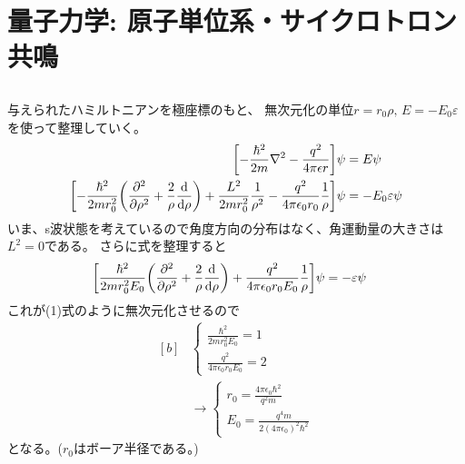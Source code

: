 \documentclass[../../sp_2013.tex]{subfiles}
\begin{document}
\section{量子力学: 原子単位系・サイクロトロン共鳴}
\subsection{}
与えられたハミルトニアンを極座標のもと、
無次元化の単位\(r=r_0 \rho,\,E=-E_0 \varepsilon\)を使って整理していく。
\begin{equation}\begin{aligned}[b]
    \qty[-\frac{\hbar^2}{2m}\laplacian - \frac{q^2}{4\pi\epsilon r}]\psi &= E\psi\\
    \qty[-\frac{\hbar^2}{2mr_0^2}\qty(\pdv[2]{\rho}
    + \frac{2}{\rho}\dv{\rho})+\frac{L^2}{2mr_0^2}\frac{1}{\rho^2}-\frac{q^2}{4\pi\epsilon_0 r_0}\frac{1}{\rho}]\psi
    &= -E_0 \varepsilon\psi
\end{aligned}\end{equation}
いま、s波状態を考えているので角度方向の分布はなく、角運動量の大きさは\(L^2=0\)である。
さらに式を整理すると
\begin{equation}\begin{aligned}[b]
    \qty[\frac{\hbar^2}{2mr_0^2E_0}\qty(\pdv[2]{\rho}
    + \frac{2}{\rho}\dv{\rho})+\frac{q^2}{4\pi\epsilon_0 r_0 E_0}\frac{1}{\rho}]\psi
    &= -\varepsilon\psi
\end{aligned}\end{equation}
これが(1)式のように無次元化させるので
\begin{equation}\begin{aligned}[b]
    &\begin{cases}
        \frac{\hbar^2}{2mr_0^2 E_0} = 1\\
        \frac{q^2}{4\pi\epsilon_0r_0 E_0} = 2
    \end{cases}\\
    &\rightarrow\begin{cases}
        r_0 = \frac{4\pi\epsilon_0\hbar^2}{q^2m}    \\
        E_0 = \frac{q^4m}{2(4\pi\epsilon_0)^2\hbar^2}
    \end{cases}
\end{aligned}\end{equation}
となる。(\(r_0\)はボーア半径である。)
\end{document}
